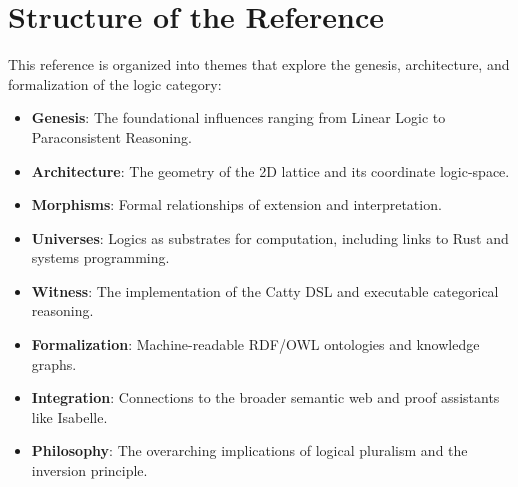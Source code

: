 \section*{Structure of the Reference}
This reference is organized into themes that explore the genesis, architecture, and formalization of the logic category:
\begin{itemize}
    \item \textbf{Genesis}: The foundational influences ranging from Linear Logic to Paraconsistent Reasoning.
    \item \textbf{Architecture}: The geometry of the 2D lattice and its coordinate logic-space.
    \item \textbf{Morphisms}: Formal relationships of extension and interpretation.
    \item \textbf{Universes}: Logics as substrates for computation, including links to Rust and systems programming.
    \item \textbf{Witness}: The implementation of the Catty DSL and executable categorical reasoning.
    \item \textbf{Formalization}: Machine-readable RDF/OWL ontologies and knowledge graphs.
    \item \textbf{Integration}: Connections to the broader semantic web and proof assistants like Isabelle.
    \item \textbf{Philosophy}: The overarching implications of logical pluralism and the inversion principle.
\end{itemize}
